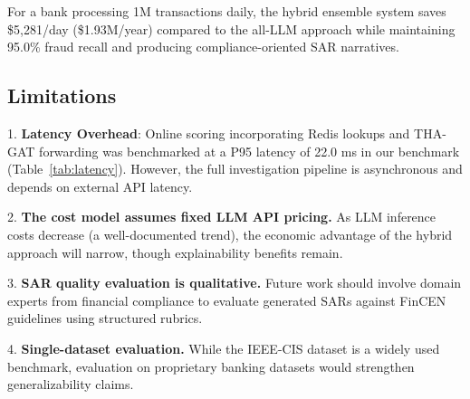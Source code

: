 \documentclass[journal]{IEEEtran}
\begin{document}
For a bank processing 1M transactions daily, the hybrid ensemble system saves \$5,281/day (\$1.93M/year) compared to the all-LLM approach while maintaining 95.0\% fraud recall and producing compliance-oriented SAR narratives.

\begin{table}[!t]
\centering
\caption{Pipeline Stage Latency Benchmark (10,000 Simulated Transactions)}
\label{tab:latency}
\end{table}

\subsection{Limitations}

1. \textbf{Latency Overhead}: Online scoring incorporating Redis lookups and THA-GAT forwarding was benchmarked at a P95 latency of 22.0 ms in our benchmark (Table~\ref{tab:latency}). However, the full investigation pipeline is asynchronous and depends on external API latency.

2. \textbf{The cost model assumes fixed LLM API pricing.} As LLM inference costs decrease (a well-documented trend), the economic advantage of the hybrid approach will narrow, though explainability benefits remain.

3. \textbf{SAR quality evaluation is qualitative.} Future work should involve domain experts from financial compliance to evaluate generated SARs against FinCEN guidelines using structured rubrics.

4. \textbf{Single-dataset evaluation.} While the IEEE-CIS dataset is a widely used benchmark, evaluation on proprietary banking datasets would strengthen generalizability claims.

\end{document}
